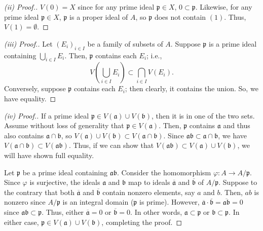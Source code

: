 \begin{proof}[(ii) Proof.]
$V(0) = X$ since for any prime ideal $\mathfrak{p} \in X$, $0 \subset \mathfrak{p}$. Likewise, for any prime ideal $\mathfrak{p} \in X$, $\mathfrak{p}$
is a proper ideal of $A$, so $\mathfrak{p}$ does not contain $(1)$. Thus, $V(1) = \emptyset$.
\end{proof}

\begin{proof}[(iii) Proof.]
Let $(E_i)_{i\in I}$ be a family of subsets of $A$. Suppose $\mathfrak{p}$ is a prime ideal containing $\bigcup_{i \in I}E_i$. Then, $\mathfrak{p}$
contains each $E_i$; i.e.,
$$V\left(\bigcup_{i \in I} E_i\right) \subset \bigcap_{i \in I} V(E_i).$$
Conversely, suppose $\mathfrak{p}$ contains each $E_i$; then clearly, it contains the union. So, we have equality.
\end{proof}

\begin{proof}[(iv) Proof.]
If a prime ideal $\mathfrak{p} \in V(\mathfrak{a})\cup V(\mathfrak{b})$, then it is in one of the two sets. Assume without loss of generality that
$\mathfrak{p} \in V(\mathfrak{a})$. Then, $\mathfrak{p}$ contains $\mathfrak{a}$ and thus also contains $\mathfrak{a} \cap \mathfrak{b}$, so
$V(\mathfrak{a}) \cup V(\mathfrak{b}) \subset V(\mathfrak{a}\cap\mathfrak{b})$. Since $\mathfrak{a}\mathfrak{b} \subset \mathfrak{a} \cap \mathfrak{b}$, we have $V(\mathfrak{a} \cap \mathfrak{b}) \subset V(\mathfrak{a}\mathfrak{b})$. Thus,
if we can show that $V(\mathfrak{a}\mathfrak{b}) \subset V(\mathfrak{a}) \cup V(\mathfrak{b})$, we will have shown full equality.

Let $\mathfrak{p}$ be a prime ideal containing $\mathfrak{a}\mathfrak{b}$. Consider the homomorphism $\varphi : A \to A/\mathfrak{p}$. Since
$\varphi$ is surjective, the ideals $\mathfrak{a}$ and $\mathfrak{b}$ map to ideals $\overline{\mathfrak{a}}$ and $\overline{\mathfrak{b}}$ 
of $A/\mathfrak{p}$. Suppose to the contrary that both $\overline{\mathfrak{a}}$ and $\overline{\mathfrak{b}}$ contain nonzero elements, 
say $a$ and $b$. Then, $ab$ is nonzero since $A/\mathfrak{p}$ is an integral domain ($\mathfrak{p}$ is prime). However, 
$\overline{\mathfrak{a}}\cdot\overline{\mathfrak{b}} = \overline{\mathfrak{ab}} = 0$ since $\mathfrak{ab} \subset \mathfrak{p}$. Thus, either $\overline{\mathfrak{a}} = 0$
or $\overline{\mathfrak{b}} = 0$. In other words, $\mathfrak{a} \subset \mathfrak{p}$ or $\mathfrak{b} \subset \mathfrak{p}$. In either case,
$\mathfrak{p} \in V(\mathfrak{a}) \cup V(\mathfrak{b})$, completing the proof.
\end{proof}

